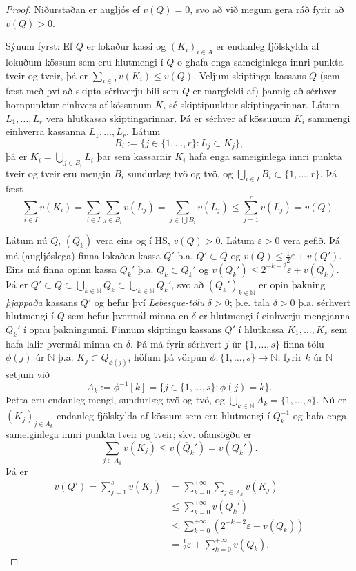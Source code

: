 \documentclass[a4paper,icelandic,11pt]{book}
\theoremstyle{plain}      \newtheorem{setn}{Setning}[chapter]
\theoremstyle{definition} \newtheorem{skilgr}[setn]{Skilgreining}
\theoremstyle{remark}     \newtheorem*{ath}{Athugasemd}
\newcommand{\N}{\mathbb N}
\begin{document}
\begin{proof}
  Niðurstaðan er augljós ef $v(Q)=0$, svo að við megum gera ráð fyrir
  að $v(Q)>0$.

  Sýnum fyrst: Ef $Q$ er lokaður kassi og $(K_{i})_{i\in A}$ er
  endanleg fjölskylda af lokuðum kössum sem eru hlutmengi í $Q$ o
  ghafa enga sameiginlega innri punkta tveir og tveir, þá er
  $\sum_{i\in I}v(K_{i})\le v(Q)$. Veljum skiptingu kassans $Q$ (sem
  fæst með því að skipta sérhverju bili sem $Q$ er margfeldi af)
  þannig að sérhver hornpunktur einhvers af kössunum $K_{i}$ sé
  skiptipunktur skiptingarinnar. Látum $L_{1},\dots,L_{r}$ vera
  hlutkassa skiptingarinnar. Þá er sérhver af kössunum $K_{i}$
  sammengi einhverra kassanna $L_1,\dots,L_r$. Látum
  \[
  B_{i} := \{  j\in\{1,\dots,r\} : L_{j}\subset K_{j}  \},
  \]
  þá er $K_{i} = \bigcup_{j\in B_{i}}L_{i}$ þar sem kassarnir $K_{i}$
  hafa enga sameiginlega innri punkta tveir og tveir eru mengin
  $B_{i}$ sundurlæg tvö og tvö, og
  $\bigcup_{i\in{I}}B_{i}\subset\{1,\dots,r\}$. Þá fæst
  \[
  \sum_{i\in I}v(K_{i})
  = \sum_{i\in I}\sum_{j\in B_{i}}v(L_{j})
  = \sum_{j\in\bigcup B_{i}} v(L_{j})
  \le \sum_{j=1}^{r}v(L_{j})
  = v(Q).
  \]
  
  Látum nú $Q$, $(Q_{k})$ vera eins og í HS, $v(Q)>0$. Látum
  $\varepsilon>0$ vera gefið. Þá má (augljóslega) finna lokaðan kassa
  $Q'$ þ.a. $Q'\subset Q$ og $v(Q)\le\frac 12\varepsilon+v(Q')$. Eins
  má finna opinn kassa $Q_{k}'$ þ.a. $Q_{k}\subset Q_{k}'$ og
  $v(Q_{k}')\le 2^{-k-2}\varepsilon+v(Q_{k})$. Þá er
  $Q'\subset{Q}\subset\bigcup_{k\in\N}Q_{k}\subset\bigcup_{k\in\N}Q_{k}'$,
  svo að $(Q_{k}')_{k\in\N}$ er opin þakning \emph{þjappaða} kassans
  $Q'$ og hefur því \emph{Lebesgue-tölu} $\delta>0$; þ.e. tala
  $\delta>0$ þ.a. sérhvert hlutmengi í $Q$ sem hefur þvermál minna en
  $\delta$ er hlutmengi í einhverju mengjanna $Q_{k}'$ í opnu
  þakningunni. Finnum skiptingu kassans $Q'$  í hlutkassa
  $K_{1},\dots,K_{s}$ sem hafa lalir þvermál minna en $\delta$. Þá má
  fyrir sérhvert $j$ úr $\{1,\dots,s\}$  finna tölu $\phi(j)$ úr $\N$
  þ.a. $K_{j}\subset Q_{\phi(j)}$, höfum þá vörpun
  $\phi:\{1,\dots,s\}\to\N$; fyrir $k$ úr $\N$ setjum við
  \[
  A_{k} := \phi^{-1}[k] = \{j\in\{1,\dots,s\} : \phi(j) = k \}.
  \]
  Þetta eru endanleg mengi, sundurlæg tvö og tvö, og
  $\bigcup_{k\in\N}A_{k}=\{1,\dots,s\}$. Nú er $(K_{j})_{j\in A_{k}}$
  endanleg fjölskylda af kössum sem eru hlutmengi í $Q_{k}^{-1}$ og
  hafa enga sameiginlega innri punkta tveir og tveir; skv. ofansögðu
  er
  \[
  \sum_{j\in A_{k}}v(K_{j})
  \le v(\overline Q_{k}')
  = v(Q_{k}').
  \]
  Þá er
  \begin{align*}
    v(Q')
    = \sum_{j=1}^{s}v(K_{j})
    &= \sum_{k=0}^{+\infty}\sum_{j\in A_{k}} v(K_{j})
    \\
    &\le \sum_{k=0}^{+\infty} v(Q_{k}')
    \\
    &\le \sum_{k=0}^{+\infty}\left(
      2^{-k-2}\varepsilon+v(Q_{k})
    \right)
    \\
    &= \frac 12\varepsilon + \sum_{k=0}^{+\infty}v(Q_{k}).
  \end{align*}
\end{proof}
\end{document}
